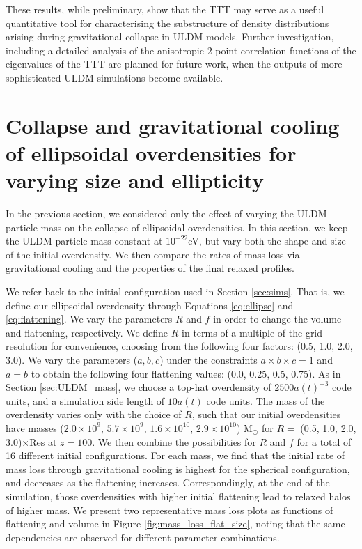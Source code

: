 \documentclass[a4paper,11pt]{article}
\begin{document}
These results, while preliminary, show that the TTT may serve as a useful quantitative tool for characterising the substructure of density distributions arising during gravitational collapse in ULDM models. Further investigation, including a detailed analysis of the anisotropic 2-point correlation functions of the eigenvalues of the TTT are planned for future work, when the outputs of more sophisticated ULDM simulations become available.


\section{Collapse and gravitational cooling of ellipsoidal overdensities for varying size and ellipticity}\label{sec:ellipticity}

In the previous section, we considered only the effect of varying the ULDM particle mass on the collapse of ellipsoidal overdensities. In this section, we keep the ULDM particle mass constant at $10^{-22}$eV, but vary both the shape and size of the initial overdensity. We then compare the rates of mass loss via gravitational cooling and the properties of the final relaxed profiles. 

We refer back to the initial configuration used in Section \ref{sec:sims}. That is, we define our ellipsoidal overdensity through Equations \ref{eq:ellipse} and \ref{eq:flattening}. We vary the parameters $R$ and $f$ in order to change the volume and flattening, respectively. We define $R$ in terms of a multiple of the grid resolution for convenience, choosing from the following four factors: (0.5, 1.0, 2.0, 3.0). We vary the parameters ($a, b, c$) under the constraints $a \times b \times c = 1$ and $a = b$ to obtain the following four flattening values: (0.0, 0.25, 0.5, 0.75). As in Section \ref{sec:ULDM_mass}, we choose a top-hat overdensity of $2500a(t)^{-3}$ code units, and a simulation side length of $10a(t)$ code units. The mass of the overdensity varies only with the choice of $R$, such that our initial overdensities have masses ($2.0\times 10^9$, $5.7\times 10^9$, $1.6\times 10^{10}$, $2.9\times 10^{10}$) M$_\odot$ for $R = $ (0.5, 1.0, 2.0, 3.0)$\times \mathrm{Res}$ at  $z=100$. We then combine the possibilities for $R$ and $f$ for a total of 16 different initial configurations. For each mass, we find that the initial rate of mass loss through gravitational cooling is highest for the spherical configuration, and decreases as the flattening increases. Correspondingly, at the end of the simulation, those overdensities with higher initial flattening lead to relaxed halos of higher mass. We present two representative mass loss plots as functions of flattening and volume in Figure \ref{fig:mass_loss_flat_size}, noting that the same dependencies are observed for different parameter combinations.
\end{document}
